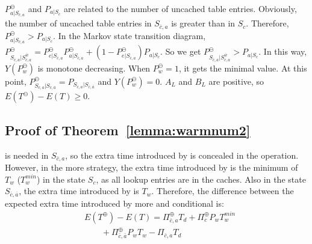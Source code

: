 $P_{a|S_{\bar{c}, a}}^{\ominus}$ and $P_{a|S_{c}}$ are related to the number of uncached table entries.
 Obviously, the number of uncached table entries in $S_{\bar{c}, a}$ is greater than in $S_{c}$.
\textcolor[rgb]{1.00,0.00,0.00}{Therefore, $P_{a|S_{\bar{c}, a}}^{\ominus} > P_{a|S_{c}}$.}
In the Markov state transition diagram,
$P_{S_{\bar{c}, a}|S_{\bar{c},a}^{\bar{w}}}^{\ominus}=P_{e|S_{\bar{c}, a}}^{\ominus}P_{a|S_{\bar{c}, a}}^{\ominus}+(1-P_{e|S_{\bar{c}, a}}^{\ominus})P_{a|S_{c}}$.
So we get $P_{S_{\bar{c}, a}|S_{\bar{c},a}^{\bar{w}}}^{\ominus} > P_{a|S_{c}}$.
In this way,
$Y(P_{w}^{\ominus})$ is monotone decreasing. When $P_{w}^{\ominus} = 1$, it gets the minimal value.
At this point, $P_{S_{\bar{c}, a}|S_{\bar{c},\bar{a}}}^{\ominus} = P_{S_{\bar{c}, a}|S_{\bar{c},\bar{a}}}$ and $Y(P_{w}^{\ominus}) = 0$.
$A_{L}$ and $B_{L}$ are positive,
so $E(T^{\ominus}) - E(T)\geq 0$.

\subsection{Proof of Theorem~\ref{lemma:warmnum2}}
\label{appendixa2}
{\vdelay} is needed in $S_{\bar{c}, a}$,
so the extra time introduced by {\vwarm} is concealed in the {\vdelay} operation.
 However, in the more {\vwarm} strategy,
the extra time introduced by {\vwarm} is the minimum of $T_{w}$ ($T_{w}^{min}$) in the state $S_{c}$, as all lookup entries are in the caches.
  Also in the state $S_{\bar{c}, \bar{a}}$, the extra time introduced by {\vwarm} is $T_{w}$.
Therefore, the difference between the expected extra time introduced by more {\vwarm} and conditional {\vwarm} is:
\begin{align}
&E(T^{\oplus})-E(T)=\Pi_{\bar{c}, a}^{\oplus} T_{d} + \Pi_{c}^{\oplus} P_{w} T_{w}^{min} \nonumber \\
 &\ \ \ \ \ \ \ \ \ + \Pi_{\bar{c}, \bar{a}}^{\oplus} P_{w} T_{w} - \Pi_{\bar{c}, a} T_{d}
\end{align}

